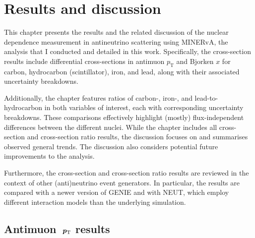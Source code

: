 \chapter{Results and discussion}

\label{ch:results} 


This chapter presents the results and the related discussion of the nuclear dependence measurement in antineutrino scattering using MINERvA, the analysis that I conducted and detailed in this work. Specifically, the cross-section results include differential cross-sections in antimuon $p_{\text{T}}$ and Bjorken $x$ for carbon, hydrocarbon (scintillator), iron, and lead, along with their associated uncertainty breakdowns.

Additionally, the chapter features ratios of carbon-, iron-, and lead-to-hydrocarbon in both variables of interest, each with corresponding uncertainty breakdowns. These comparisons effectively highlight (mostly) flux-independent differences between the different nuclei. While the chapter includes all cross-section and cross-section ratio results, the discussion focuses on and summarises observed general trends. The discussion also considers potential future improvements to the analysis.

Furthermore, the cross-section and cross-section ratio results are reviewed in the context of other (anti)neutrino event generators. In particular, the results are compared with a newer version of GENIE and with NEUT, which employ different interaction models than the underlying simulation.


\section[Antimuon~${p_{\text{T}}}$ results]{Antimuon~$\boldmath{p_{\text{T}}}$ results}


